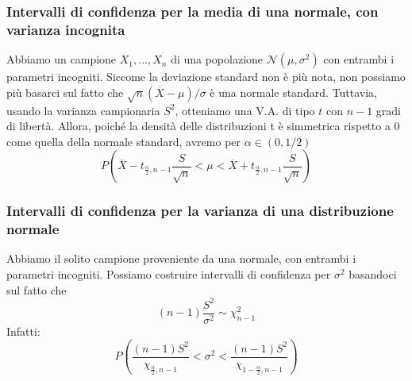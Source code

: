 \documentclass[11pt]{article}
\begin{document}
\subsubsection{Intervalli di confidenza per la media di una normale, con varianza incognita}
Abbiamo un campione $X_1,...,X_n$ di una popolazione $\mathcal{N}(\mu, \sigma^2)$ con entrambi i parametri incogniti. Siccome la deviazione standard non è più nota, non possiamo più basarci sul fatto che $\sqrt{n}(\overline{X}-\mu)/\sigma$ è una normale standard. Tuttavia, usando la varianza campionaria $S^2$, otteniamo una V.A. di tipo $t$ con $n-1$ gradi di libertà. Allora, poiché la densità delle distribuzioni t è simmetrica rispetto a 0 come quella della normale standard, avremo per $\alpha \in (0,1/2)$
\begin{displaymath}
    P\left(\overline{X}-t_{\frac{\alpha}{2}, n-1}\frac{S}{\sqrt{n}} < \mu <  \overline{X}+t_{\frac{\alpha}{2}, n-1}\frac{S}{\sqrt{n}}\right)
\end{displaymath}
\subsubsection{Intervalli di confidenza per la varianza di una distribuzione normale}
Abbiamo il solito campione proveniente da una normale, con entrambi i parametri incogniti. Possiamo costruire intervalli di confidenza per $\sigma^2$ basandoci sul fatto che
\begin{displaymath}
    (n-1)\frac{S^2}{\sigma^2} \sim \chi_{n-1}^2
\end{displaymath}
Infatti:
\begin{displaymath}
    P\left(\frac{(n-1)S^2}{\chi_{\frac{\alpha}{2},n-1}} < \sigma^2 <    \frac{(n-1)S^2}{\chi_{1-\frac{\alpha}{2},n-1}}\right)
\end{displaymath}
\end{document}

